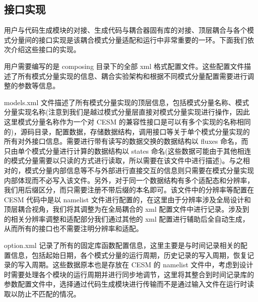 \subsection{接口实现}

用户与代码生成模块的对接、生成代码与耦合器固有库的对接、顶层耦合与各个模式分量间的接口实现是该耦合模式分量适配和运行中非常重要的一环。下面我们依次介绍这些接口的实现。

用户需要编写的是 composing 目录下的全部 xml 格式配置文件。这些配置文件描述了所有模式分量实现的信息、耦合实验架构和根据不同模式分量配置需要进行调整的参数等信息。

models.xml 文件描述了所有模式分量实现的顶层信息，包括模式分量名称、模式分量实现名称(注意到我们是越过模式分量层直接对模式分量实现进行操作，因此这里模式分量名称作为一个对 CESM 的兼容性接口是可以有多个实现的名称相同的)，源码目录，配置数据，存储数据结构，调用接口等关于单个模式分量实现的所有对外接口信息。需要进行带有读写的数据交换的数据结构以 fluxes 命名，而只由单个模式分量进行计算的数据结构以 states 命名(这些数据可能由于其他相连的模式分量需要以只读的方式进行读取，所以需要在该文件中进行描述)。与之相对的，模式分量内部信息等不与外部进行直接交互的信息则只需要在模式分量实现内部体现而不必写入该文件。另外，对于同一个数据结构有多个适配态和分辨率，我们用后缀区分，而只需要注册不带后缀的本名即可。该文件中的分辨率等配置在 CESM 代码中是以 namelist 文件进行配置的，在这里由于分辨率涉及全局设计和顶层耦合视角，我们将其调整为在全局耦合的 xml 配置文件中进行记录。涉及到的相关分辨率调整和适配部分我们通过其他的 xml 配置进行辅助后全自动生成，从而所有的接口也不需要注明分辨率和适配。

option.xml 记录了所有的固定库函数配置信息，这里主要是与时间记录相关的配置信息，包括起始日期，各个模式分量的运行周期，历史记录的写入周期，恢复记录的写入周期。这些数据原本也是存放在 CESM 的 namelist 文件中，考虑到设计时需要处理各个模块的运行周期并进行同步地调节，这里将其整合到时间记录库的参数配置文件中，选择通过代码生成模块进行传输而不是通过输入文件在运行时读取以防止不匹配的情况。


